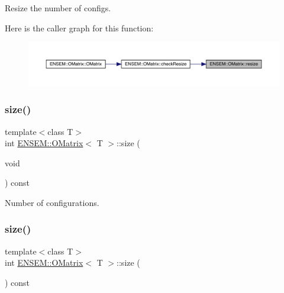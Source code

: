 Resize the number of configs. 

Here is the caller graph for this function\+:\nopagebreak
\begin{figure}[H]
\begin{center}
\leavevmode
\includegraphics[width=350pt]{dd/d80/classENSEM_1_1OMatrix_abb999e63b84b6d958e43443dc04e46be_icgraph}
\end{center}
\end{figure}
\mbox{\label{classENSEM_1_1OMatrix_a837821b951450cd49d3db25f566f5e47}} 
\subsubsection{\texorpdfstring{size()}{size()}\hspace{0.1cm}{\footnotesize\ttfamily [1/2]}}
{\footnotesize\ttfamily template$<$class T$>$ \\
int \mbox{\hyperlink{classENSEM_1_1OMatrix}{E\+N\+S\+E\+M\+::\+O\+Matrix}}$<$ T $>$\+::size (\begin{DoxyParamCaption}\item[{void}]{ }\end{DoxyParamCaption}) const\hspace{0.3cm}{\ttfamily [inline]}}



Number of configurations. 

\mbox{\label{classENSEM_1_1OMatrix_a837821b951450cd49d3db25f566f5e47}} 
\subsubsection{\texorpdfstring{size()}{size()}\hspace{0.1cm}{\footnotesize\ttfamily [2/2]}}
{\footnotesize\ttfamily template$<$class T$>$ \\
int \mbox{\hyperlink{classENSEM_1_1OMatrix}{E\+N\+S\+E\+M\+::\+O\+Matrix}}$<$ T $>$\+::size (\begin{DoxyParamCaption}{ }\end{DoxyParamCaption}) const\hspace{0.3cm}{\ttfamily [inline]}}



